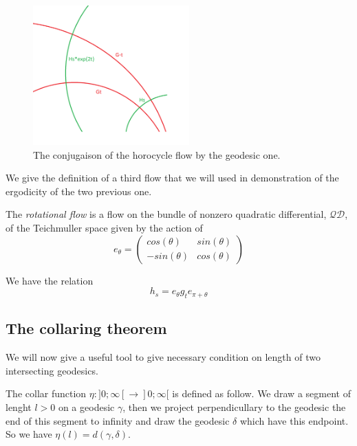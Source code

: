 \begin{figure}[h!]
\centering
\includegraphics[width=6cm]{Image/Commutatoin.png}
\caption{The conjugaison of the horocycle flow by the geodesic one.}
\end{figure}


We give the definition of a third flow that we will used in demonstration of the ergodicity of the two previous one.

\begin{dfnt}
The \emph{rotational flow} is a flow on the bundle of nonzero quadratic differential, $\mathcal{QD}$, of the Teichmuller space given by the action of \[
e_{\theta}=\begin{pmatrix}
cos(\theta) & sin(\theta) \\
-sin(\theta) & cos(\theta)
\end{pmatrix}
\]
\end{dfnt}

We have the relation \[
h_s=e_{\theta}g_t e_{\pi+\theta}
\]

\subsection{The collaring theorem}

We will now give a useful tool to give necessary condition on length of two intersecting geodesics.

The collar function $\eta:]0; \infty[ \to ]0;\infty[$ is defined as follow. We draw a segment of lenght $l > 0$ on a geodesic $\gamma$, then we project perpendicullary to the geodesic the end of this segment to infinity and draw the geodesic $\delta$ which have this endpoint. So we have $\eta(l)=d(\gamma,\delta)$.


